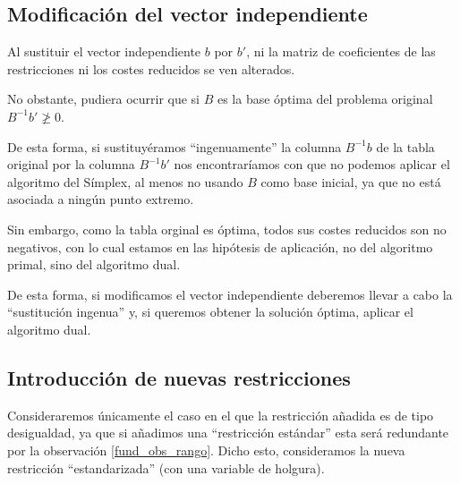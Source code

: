 \subsection{Modificación del vector independiente}
Al sustituir el vector independiente $b$ por $b'$, ni la matriz de coeficientes de las restricciones ni los costes reducidos se ven alterados.

No obstante, pudiera ocurrir que si $B$ es la base óptima del problema original $B^{-1}b'\not\geq 0$.

De esta forma, si sustituyéramos ``ingenuamente'' la columna $B^{-1}b$ de la tabla original por la columna $B^{-1}b'$ nos encontraríamos con que no podemos aplicar el algoritmo del Símplex, al menos no usando $B$ como base inicial, ya que no está asociada a ningún punto extremo.

Sin embargo, como la tabla orginal es óptima, todos sus costes reducidos son no negativos, con lo cual estamos en las hipótesis de aplicación, no del algoritmo primal, sino del algoritmo dual.

De esta forma, si modificamos el vector independiente deberemos llevar a cabo la ``sustitución ingenua'' y, si queremos obtener la solución óptima, aplicar el algoritmo dual.
\subsection{Introducción de nuevas restricciones}
Consideraremos únicamente el caso en el que la restricción añadida es de tipo desigualdad, ya que si añadimos una ``restricción estándar'' esta será redundante por la observación \ref{fund_obs_rango}. Dicho esto, consideramos la nueva restricción ``estandarizada'' (con una variable de holgura).

